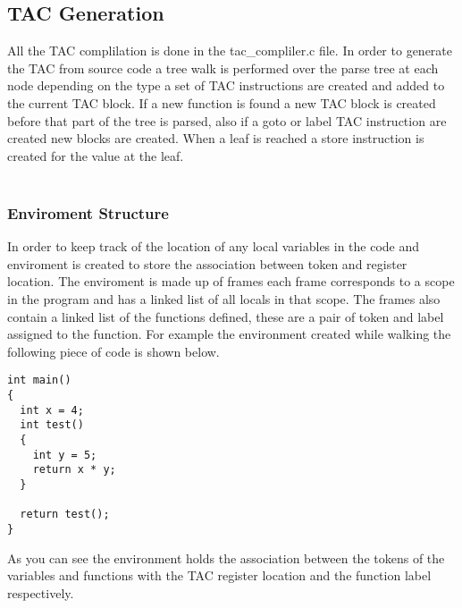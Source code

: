 \documentclass{article}
\begin{document}
\subsection{TAC Generation}

All the TAC complilation is done in the tac\_compliler.c file.
In order to generate the TAC from source code a tree walk is performed over the
parse tree at each node depending on the type a set of TAC instructions are created
and added to the current TAC block. If a new function is found a new TAC block is
created before that part of the tree is parsed, also if a goto or label TAC instruction
are created new blocks are created. When a leaf is reached a store instruction is
created for the value at the leaf.\\~\\

\subsubsection{Enviroment Structure}

In order to keep track of the location of any local variables in the code and enviroment
is created to store the association between token and register location. The enviroment
is made up of frames each frame corresponds to a scope in the program and has
a linked list of all locals in that scope. The frames also contain a linked list of
the functions defined, these are a pair of token and label assigned to the function.
For example the environment created while walking the following piece of code is shown below.

\begin{lstlisting}
int main()
{
  int x = 4;
  int test()
  {
    int y = 5;
    return x * y;
  }

  return test();
}
\end{lstlisting}


As you can see the environment holds the association between the tokens of the variables
and functions with the TAC register location and the function label respectively.
\end{document}
